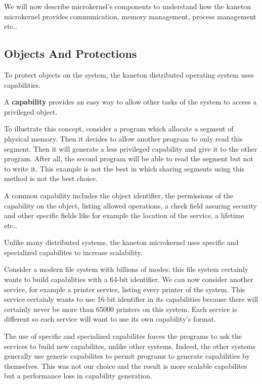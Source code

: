 \begin{multicols}{2}
\begin{enumerate}
\end{enumerate}

We will now describe microkernel's components to understand how the kaneton
microkernel provides communication, memory management, process management etc..

\subsection{Objects And Protections}

To protect objects on the system, the kaneton distributed operating system uses
capabilities.

A \textbf{capability} provides an easy way to allow other tasks of the
system to access a privileged object.

To illustrate this concept, consider a program which allocate a segment of
physical memory. Then it decides to allow another program to only read
this segment. Then it will generate a less privileged capability and give
it to the other program. After all, the second program will be able to read
the segment but not to write it. This example is not the best in which sharing
segments using this method is not the best choice.

A common capability includes the object identifier, the permissions of the
capability on the object, listing allowed operations, a check field assuring
security and other specific fields like for example the location of the
service, a lifetime etc..

Unlike many distributed systems, the kaneton microkernel uses specific and
specialized capabilites to increase scalability.

Consider a modern file system with billions of inodes; this file system
certainly wants to build capabilities with a 64-bit identifier.
We can now consider another service, for example a printer service, listing
every printer of the system. This service certainly wants to use 16-bit
identifier in its capabilities because there will certainly never be more than
65000 printers on this system. Each service is different so each service
will want to use its own capability's format.

The use of specific and specialized capabilites forces the programs to ask
the services to build new capabilites, unlike other systems. Indeed,
the other systems generally use generic capabilites to permit programs to
generate capabilities by themselves. This was not our choice and the result is
more scalable capabilites but a performance loss in capability generation.


\end{multicols}
